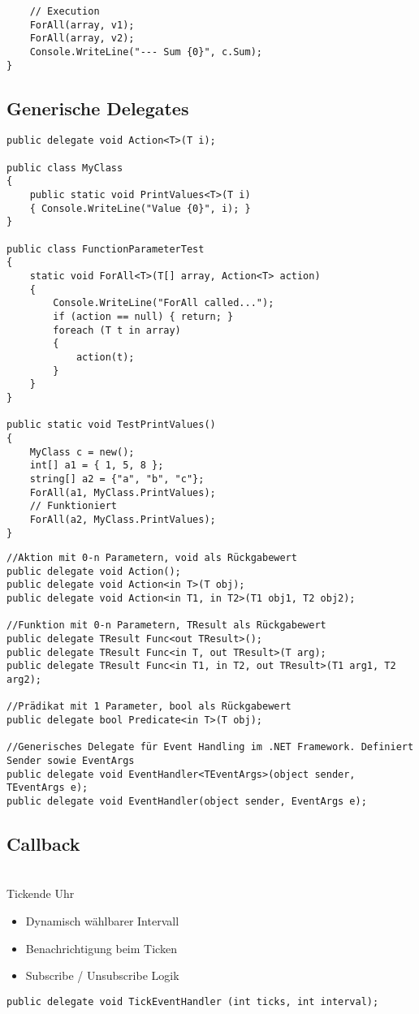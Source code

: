 \begin{multicols*}{2}
\begin{lstlisting}
    // Execution
    ForAll(array, v1);
    ForAll(array, v2);
    Console.WriteLine("--- Sum {0}", c.Sum);
}
\end{lstlisting}

\subsection{Generische Delegates}
\begin{lstlisting}
public delegate void Action<T>(T i);

public class MyClass
{
    public static void PrintValues<T>(T i)
    { Console.WriteLine("Value {0}", i); }
}

public class FunctionParameterTest
{
    static void ForAll<T>(T[] array, Action<T> action)
    {
        Console.WriteLine("ForAll called...");
        if (action == null) { return; }
        foreach (T t in array)
        {
            action(t); 
        }
    } 
}

public static void TestPrintValues()
{
    MyClass c = new();
    int[] a1 = { 1, 5, 8 };
    string[] a2 = {"a", "b", "c"};
    ForAll(a1, MyClass.PrintValues);
    // Funktioniert
    ForAll(a2, MyClass.PrintValues);
}
\end{lstlisting}
\begin{lstlisting}
//Aktion mit 0-n Parametern, void als Rückgabewert
public delegate void Action();
public delegate void Action<in T>(T obj);
public delegate void Action<in T1, in T2>(T1 obj1, T2 obj2);

//Funktion mit 0-n Parametern, TResult als Rückgabewert
public delegate TResult Func<out TResult>();
public delegate TResult Func<in T, out TResult>(T arg);
public delegate TResult Func<in T1, in T2, out TResult>(T1 arg1, T2 arg2);

//Prädikat mit 1 Parameter, bool als Rückgabewert
public delegate bool Predicate<in T>(T obj);

//Generisches Delegate für Event Handling im .NET Framework. Definiert Sender sowie EventArgs
public delegate void EventHandler<TEventArgs>(object sender, TEventArgs e);
public delegate void EventHandler(object sender, EventArgs e);
\end{lstlisting}
\subsection{Callback}
\\Tickende Uhr
\begin{itemize}
    \item Dynamisch wählbarer Intervall
    \item Benachrichtigung beim Ticken
    \item Subscribe / Unsubscribe Logik
\end{itemize}
\begin{lstlisting}
public delegate void TickEventHandler (int ticks, int interval);


\end{lstlisting}
\end{multicols*}
